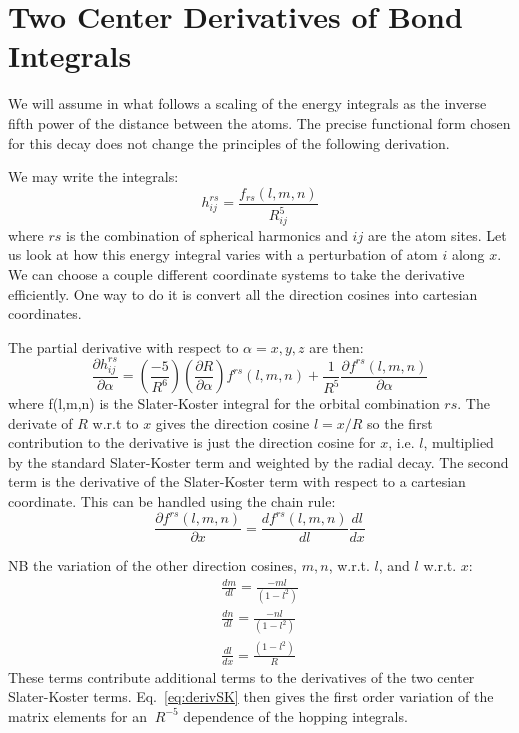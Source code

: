 \section{Two Center Derivatives of Bond Integrals}
We will assume in what follows a scaling of the energy integrals 
as the inverse fifth power of the distance between the atoms.
The precise functional form chosen for this decay does not change
the principles of the following derivation.

We may write the integrals:
%
\begin{equation}
h^{rs}_{ij} = \frac{f_{rs}(l,m,n)}{R_{ij}^{5}}
\end{equation}
where $rs$ is the combination of spherical harmonics and $ij$ are the atom sites.
Let us look at how this energy integral varies with a perturbation of atom $i$ along $x$.
We can choose a couple different coordinate systems to take the derivative efficiently.
One way to do it is convert all the direction cosines into cartesian coordinates.

The partial derivative with respect to $\alpha = x,y,z$ are then:
%
\begin{equation}
\label{eq:derivSK}
\frac{\partial h^{rs}_{ij}}{\partial \alpha} = (\frac{-5}{R^{6}})(\frac{\partial R}{\partial \alpha})f^{rs}(l,m,n) 
                                             + \frac{1}{R^{5}}\frac{\partial f^{rs}(l,m,n)}{\partial \alpha}
\end{equation}
%
where f(l,m,n) is the Slater-Koster integral for the orbital combination $rs$.
The derivate of $R$ w.r.t to $x$ gives the direction cosine $l=x/R$ so the first contribution to the 
derivative is just the direction cosine for $x$, i.e. $l$, multiplied by 
the standard Slater-Koster term and weighted by the radial decay. 
The second term is the derivative of the Slater-Koster term with 
respect to a cartesian coordinate. This can be handled using the chain rule:
%
\begin{equation}
\frac{\partial f^{rs}(l,m,n)}{\partial x} = \frac{df^{rs}(l,m,n)}{dl}\frac{dl}{dx}
\end{equation}
%

NB the variation of the other direction cosines, $m,n$, w.r.t. $l$, and 
$l$ w.r.t. $x$: 
%
\begin{align}
\frac{dm}{dl} = \frac{-ml}{(1-l^2)} \\
\frac{dn}{dl} = \frac{-nl}{(1-l^2)} \\
\frac{dl}{dx} = \frac{(1-l^{2})}{R}
\end{align}
%
These terms contribute additional terms to the derivatives of the 
two center Slater-Koster terms. Eq.~\ref{eq:derivSK} then 
gives the first order variation of the matrix elements for
an $~R^{-5}$ dependence of the hopping integrals.

